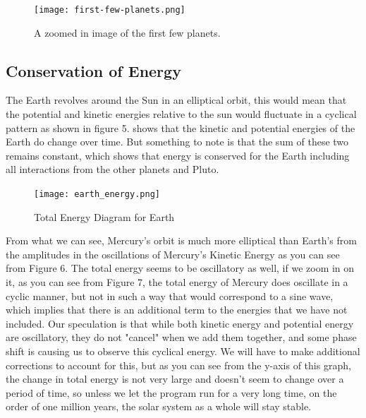 \documentclass{article}
\begin{document}
\begin{figure}[h!]
\centering
\texttt{[image: first-few-planets.png]}
\caption{A zoomed in image of the first few planets.}
\label{first_few_planets}
\end{figure}


\subsection{Conservation of Energy}
The Earth revolves around the Sun in an elliptical orbit, this would mean that the potential and kinetic energies relative to the sun would fluctuate in a cyclical pattern as shown in figure 5. shows that the kinetic and potential energies of the Earth do change over time. But something to note is that the sum of these two remains constant, which shows that energy is conserved for the Earth including all interactions from the other planets and Pluto. \\

\begin{figure}[h!]
\centering
\texttt{[image: earth\_energy.png]}
\caption{Total Energy Diagram for Earth}
\label{earth energy}
\end{figure}

From what we can see, Mercury's orbit is much more elliptical than Earth's from the amplitudes in the oscillations of Mercury's Kinetic Energy as you can see from Figure 6. The total energy seems to be oscillatory as well, if we zoom in on it, as you can see from Figure 7, the total energy of Mercury does oscillate in a cyclic manner, but not in such a way that would correspond to a sine wave, which implies that there is an additional term to the energies that we have not included. Our speculation is that while both kinetic energy and potential energy are oscillatory, they do not "cancel" when we add them together, and some phase shift is causing us to observe this cyclical energy. We will have to make additional corrections to account for this, but as you can see from the y-axis of this graph, the change in total energy is not very large and doesn't seem to change over a period of time, so unless we let the program run for a very long time, on the order of one million years, the solar system as a whole will stay stable.
\end{document}

